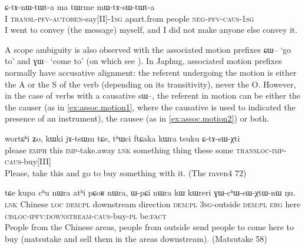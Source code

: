 \documentclass[oldfontcommands,oneside,a4paper,11pt]{article}
\newcommand{\ipa}[1]{{\phon \mbox{#1}}} %
\newcommand{\sg}{\textsc{sg}}
\newcommand{\wav}[1]{}%
\newcommand{\pfv}{\textsc{pfv}}
\newcommand{\auto}{\textsc{autoben}}
\newcommand{\caus}{\textsc{caus}}
\newcommand{\negat}{\textsc{neg}}
\newcommand{\transloc}{\textsc{transl}}
\begin{document}
  \begin{exe}
\ex
\gll \ipa{aʑo} 	\ipa{ɕ-tɤ-nɯ-tɯt-a} 	\ipa{ma} 	\ipa{tɯrme} 	\ipa{mɯ-tɤ-sɯ-tɯt-a} \\
I \transloc{}-\pfv{}-\auto{}-say[II]-1\sg{} apart.from people \negat{}-\pfv{}-\caus{}-1\sg{} \\
  \glt    I went to convey (the message) myself,  and I did not make anyone else convey it. \wav{8_mWtAsWtWta}
  \end{exe} 
 
A scope ambiguity is also observed with the associated motion prefixes \ipa{ɕɯ--} `go to' and  \ipa{ɣɯ--} `come to' (on which see \citealt{jacques13harmonization}). In Japhug, associated motion prefixes normally have accusative alignment: the referent undergoing the motion is either the A or the S of the verb (depending on its transitivity), never the O. However, in the case of verbs with a causative \ipa{sɯ--}, the referent in motion can be either the  the causer (as in \ref{ex:assoc.motion1}, where the causative is used to indicated the presence of an instrument), the causee (as in \ref{ex:assoc.motion2}) or both.


  \begin{exe}
\ex \label{ex:assoc.motion1}
\gll
\ipa{wortɕʰi} 	\ipa{ʑo,} 	\ipa{kɯki} 	\ipa{jɤ-tsɯm} 	\ipa{tɕe,} 	\ipa{tʰɯci} 	\ipa{ftɕaka} 	\ipa{kɯra} 	\ipa{tsuku} 	\ipa{ɕ-tɤ-sɯ-χti} \\
please \textsc{emph} this \textsc{imp}-take.away \textsc{lnk} something thing these some \textsc{transloc-imp-caus}-buy[III] \\
\glt Please, take this and go to buy something with it. (The raven4 72)
  \end{exe} 


  \begin{exe}
\ex \label{ex:assoc.motion2}
\gll
\ipa{tɕe} 	\ipa{kupa} 	\ipa{cʰu} 	\ipa{nɯra} 	\ipa{atʰi} 	\ipa{pɕoʁ} 	\ipa{nɯra,} 	\ipa{ɯ-pɕi} 	\ipa{nɯra} 	\ipa{kɯ} 	\ipa{kɯreri} 	\ipa{ɣɯ-cʰɯ-sɯ-χtɯ-nɯ} 	\ipa{ŋu.}  \\
\textsc{lnk} Chinese \textsc{loc} \textsc{dem:pl} downstream direction \textsc{dem:pl} \textsc{3sg}-outside  \textsc{dem:pl}  \textsc{erg} here \textsc{cisloc-ipfv:downstream-caus}-buy-\textsc{pl} be\textsc{:fact} \\
\glt People from the Chinese areas, people from outside send people to come here to buy (matsutake and sell them in the areas downstream). (Matsutake 58)
  \end{exe} 
\end{document}
